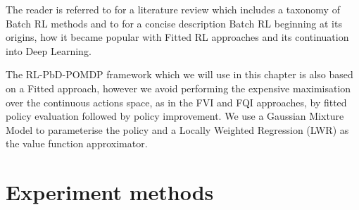 The reader is referred to \cite{approx_rl_overview_2011} for a literature review which includes a taxonomy of 
Batch RL methods and to \cite[Chap 2]{RL_state_art_2012} for a concise description Batch RL beginning at 
its origins, how it became popular with Fitted RL approaches and its continuation into Deep Learning.

The RL-PbD-POMDP framework which we will use in this chapter is also based on a Fitted approach, however we 
avoid performing the expensive maximisation over the continuous actions space, as in the FVI and FQI approaches, 
by fitted policy evaluation followed by policy improvement. We use a Gaussian Mixture Model to parameterise 
the policy and a Locally Weighted Regression (LWR) as the value function approximator.


\section{Experiment methods}\label{ch4:experiment}



%
%
%

%
%

